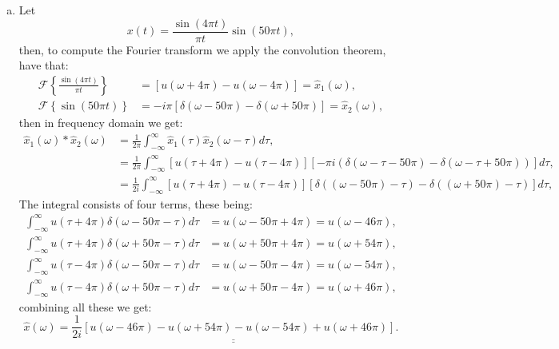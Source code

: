\begin{enumerate}
\begin{enumerate}[a)]
          \item Let
                \[ x(t)=\frac{\sin(4\pi t)}{\pi t}\sin(50\pi t), \]
                then, to compute the Fourier transform we apply the convolution theorem, have that:
                \begin{align*}
                  \mathcal{F}\left\{\frac{\sin(4\pi t)}{\pi t}\right\} & =[u(\omega+4\pi)-u(\omega-4\pi)]=\hat{x}_{1}(\omega),                  \\
                  \mathcal{F}\left\{\sin(50\pi t)\right\}              & =-i\pi[\delta(\omega-50\pi)-\delta(\omega+50\pi)]=\hat{x}_{2}(\omega),
                \end{align*}
                then in frequency domain we get:
                \begin{align*}
                  \hat{x}_{1}(\omega)*\hat{x}_{2}(\omega) & =\frac{1}{2\pi}\int_{-\infty}^{\infty}\hat{x}_{1}(\tau)\hat{x}_{2}(\omega-\tau)d\tau,                                                \\
                                                          & =\frac{1}{2\pi}\int_{-\infty}^{\infty}[u(\tau+4\pi)-u(\tau-4\pi)][-\pi i(\delta(\omega-\tau-50\pi)-\delta(\omega-\tau+50\pi))]d\tau, \\
                                                          & =\frac{1}{2i}\int_{-\infty}^{\infty}[u(\tau+4\pi)-u(\tau-4\pi)][\delta((\omega-50\pi)-\tau)-\delta((\omega+50\pi)-\tau)]d\tau,
                \end{align*}
                The integral consists of four terms, these being:
                \begin{align*}
                  \int_{-\infty}^{\infty}u(\tau+4\pi)\delta(\omega-50\pi-\tau)d\tau & =u(\omega-50\pi+4\pi)=u(\omega-46\pi), \\
                  \int_{-\infty}^{\infty}u(\tau+4\pi)\delta(\omega+50\pi-\tau)d\tau & =u(\omega+50\pi+4\pi)=u(\omega+54\pi), \\
                  \int_{-\infty}^{\infty}u(\tau-4\pi)\delta(\omega-50\pi-\tau)d\tau & =u(\omega-50\pi-4\pi)=u(\omega-54\pi), \\
                  \int_{-\infty}^{\infty}u(\tau-4\pi)\delta(\omega+50\pi-\tau)d\tau & =u(\omega+50\pi-4\pi)=u(\omega+46\pi),
                \end{align*}
                combining all these we get:
                \[ \hat{x}(\omega)=\underline{\underline{\frac{1}{2i}[u(\omega-46\pi)-u(\omega+54\pi)-u(\omega-54\pi)+u(\omega+46\pi)]}}. \]


\end{enumerate}
\end{enumerate}
